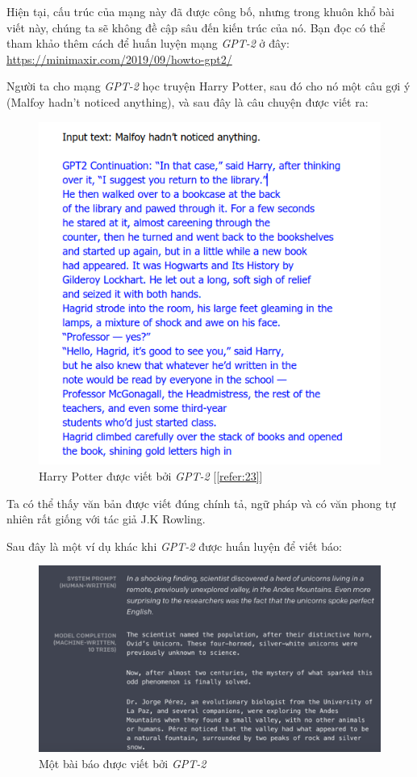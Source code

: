 Hiện tại, cấu trúc của mạng này đã được công bố, nhưng trong khuôn khổ bài viết này, chúng ta sẽ không đề cập sâu đến kiến trúc của nó. Bạn đọc có thể tham khảo thêm cách để huấn luyện mạng \textit{GPT-2} ở đây: \url{https://minimaxir.com/2019/09/howto-gpt2/}

Người ta cho mạng \textit{GPT-2} học truyện Harry Potter, sau đó cho nó một câu gợi ý (Malfoy hadn't noticed anything), và sau đây là câu chuyện được viết ra:

\begin{figure}[h!]
	\centering
		\includegraphics[width=0.7\columnwidth]{chapter07/figure-sec3/gpt-2-harrypotter.png}
		\centering
	\caption{Harry Potter được viết bởi \textit{GPT-2} [\ref{refer:23}]}
\end{figure}

Ta có thể thấy văn bản được viết đúng chính tả, ngữ pháp và có văn phong tự nhiên rất giống với tác giả J.K Rowling.

Sau đây là một ví dụ khác khi \textit{GPT-2} được huấn luyện để viết báo:

\begin{figure}[h!]
	\centering
		\includegraphics[width=1\columnwidth]{chapter07/figure-sec3/gpt-2-papers.png}
		\centering
	\caption{Một bài báo được viết bởi \textit{GPT-2}}
\end{figure}

